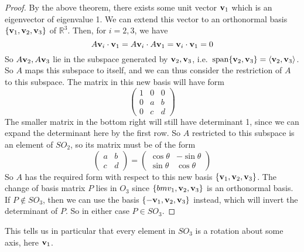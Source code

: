 \begin{proof}
	By the above theorem, there exists some unit vector \(\vb v_1\) which is an eigenvector of eigenvalue 1.
	We can extend this vector to an orthonormal basis \(\{ \vb v_1, \vb v_2, \vb v_3 \}\) of \(\mathbb R^3\).
	Then, for \(i=2,3\), we have
	\[
		A\vb v_i \cdot \vb v_1 = A\vb v_i \cdot A\vb v_1 = \vb v_i \cdot \vb v_1 = 0
	\]
	So \(A\vb v_2, A\vb v_3\) lie in the subspace generated by \(\vb v_2, \vb v_3\), i.e.\ \(\operatorname{span} \{ \vb v_2, \vb v_3 \} = \langle{} \vb v_2, \vb v_3 \rangle\).
	So \(A\) maps this subspace to itself, and we can thus consider the restriction of \(A\) to this subspace.
	The matrix in this new basis will have form
	\[
		\begin{pmatrix}
			1 & 0 & 0 \\
			0 & a & b \\
			0 & c & d
		\end{pmatrix}
	\]
	The smaller matrix in the bottom right will still have determinant 1, since we can expand the determinant here by the first row.
	So \(A\) restricted to this subspace is an element of \(SO_2\), so its matrix must be of the form
	\[
		\begin{pmatrix}
			a & b \\ c & d
		\end{pmatrix} = \begin{pmatrix}
			\cos \theta & -\sin \theta \\
			\sin \theta & \cos \theta
		\end{pmatrix}
	\]
	So \(A\) has the required form with respect to this new basis \(\{ \vb v_1, \vb v_2, \vb v_3 \}\).
	The change of basis matrix \(P\) lies in \(O_3\) since \(\{ bm v_1, \vb v_2, \vb v_3 \}\) is an orthonormal basis.
	If \(P \notin SO_3\), then we can use the basis \(\{ -\vb v_1, \vb v_2, \vb v_3 \}\) instead, which will invert the determinant of \(P\).
	So in either case \(P \in SO_3\).
\end{proof}
This tells us in particular that every element in \(SO_3\) is a rotation about some axis, here \(\vb v_1\).

